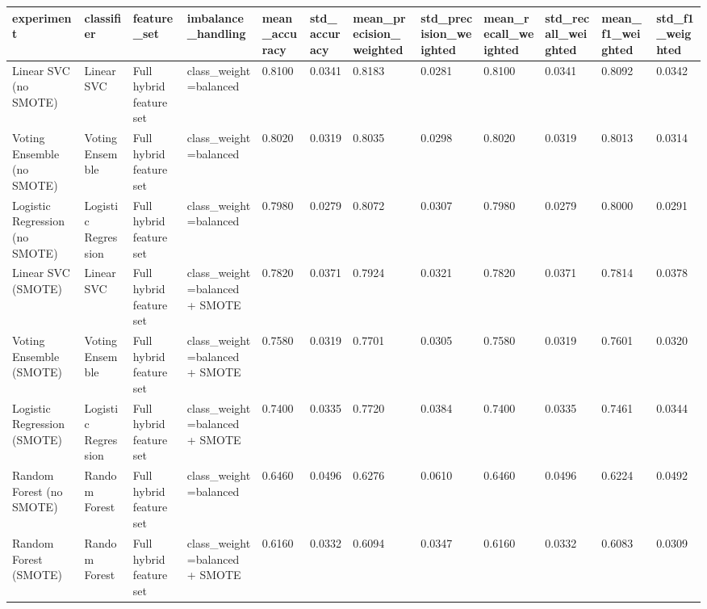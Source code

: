 \begin{tabular}{llllllllllll}
\toprule
experiment & classifier & feature\_set & imbalance\_handling & mean\_accuracy & std\_accuracy & mean\_precision\_weighted & std\_precision\_weighted & mean\_recall\_weighted & std\_recall\_weighted & mean\_f1\_weighted & std\_f1\_weighted \\
\midrule
Linear SVC (no SMOTE) & Linear SVC & Full hybrid feature set & class\_weight=balanced & 0.8100 & 0.0341 & 0.8183 & 0.0281 & 0.8100 & 0.0341 & 0.8092 & 0.0342 \\
Voting Ensemble (no SMOTE) & Voting Ensemble & Full hybrid feature set & class\_weight=balanced & 0.8020 & 0.0319 & 0.8035 & 0.0298 & 0.8020 & 0.0319 & 0.8013 & 0.0314 \\
Logistic Regression (no SMOTE) & Logistic Regression & Full hybrid feature set & class\_weight=balanced & 0.7980 & 0.0279 & 0.8072 & 0.0307 & 0.7980 & 0.0279 & 0.8000 & 0.0291 \\
Linear SVC (SMOTE) & Linear SVC & Full hybrid feature set & class\_weight=balanced + SMOTE & 0.7820 & 0.0371 & 0.7924 & 0.0321 & 0.7820 & 0.0371 & 0.7814 & 0.0378 \\
Voting Ensemble (SMOTE) & Voting Ensemble & Full hybrid feature set & class\_weight=balanced + SMOTE & 0.7580 & 0.0319 & 0.7701 & 0.0305 & 0.7580 & 0.0319 & 0.7601 & 0.0320 \\
Logistic Regression (SMOTE) & Logistic Regression & Full hybrid feature set & class\_weight=balanced + SMOTE & 0.7400 & 0.0335 & 0.7720 & 0.0384 & 0.7400 & 0.0335 & 0.7461 & 0.0344 \\
Random Forest (no SMOTE) & Random Forest & Full hybrid feature set & class\_weight=balanced & 0.6460 & 0.0496 & 0.6276 & 0.0610 & 0.6460 & 0.0496 & 0.6224 & 0.0492 \\
Random Forest (SMOTE) & Random Forest & Full hybrid feature set & class\_weight=balanced + SMOTE & 0.6160 & 0.0332 & 0.6094 & 0.0347 & 0.6160 & 0.0332 & 0.6083 & 0.0309 \\
\bottomrule
\end{tabular}
